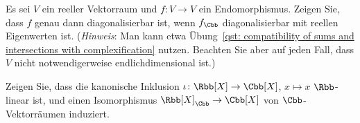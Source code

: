 \begin{question}
  Es sei $V$ ein reeller Vektorraum und $f \colon V \to V$ ein Endomorphismus.
  Zeigen Sie, dass $f$ genau dann diagonalisierbar ist, wenn $f_\Cbb$ diagonalisierbar mit reellen Eigenwerten ist.
  \newline
  (\emph{Hinweis}:
   Man kann etwa Übung~\ref{qst: compatibility of sums and intersections with complexification} nutzen.
   Beachten Sie aber auf jeden Fall, dass $V$ nicht notwendigerweise endlichdimensional ist.)
\end{question}


\begin{question}
  Zeigen Sie, dass die kanonische Inklusion $\iota \colon \Rbb[X] \to \Cbb[X]$, $x \mapsto x$ $\Rbb$-linear ist, und einen Isomorphismus $\Rbb[X]_\Cbb \to \Cbb[X]$ von $\Cbb$-Vektorräumen induziert.
\end{question}


